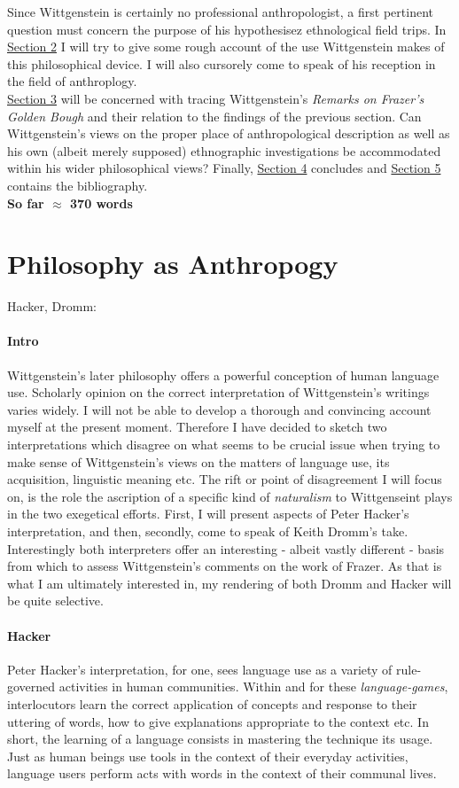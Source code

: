 \documentclass{article}
\begin{document}
Since Wittgenstein is certainly no professional anthropologist, a first pertinent question must concern the purpose of his hypothesisez ethnological field trips. In \hyperlink{sec2}{Section 2} I will try to give some rough account of the use Wittgenstein makes of this philosophical device. I will also cursorely come to speak of his reception in the field of anthroplogy. \\
\hyperlink{sec3}{Section 3} will be concerned with tracing Wittgenstein's \textit{Remarks on Frazer's Golden Bough} and their relation to the findings of the previous section. Can Wittgenstein’s views on the proper place of anthropological description as well as his own (albeit merely supposed) ethnographic investigations be accommodated within his wider philosophical views? Finally, \hyperlink{sec4}{Section 4} concludes and \hyperlink{sec4}{Section 5} contains the bibliography.\\
\textbf{So far $\approx$ 370 words} 
\section{Philosophy as Anthropogy}
\hypertarget{sec2}{Hacker, Dromm:}

\paragraph{Intro} Wittgenstein's later philosophy offers a powerful conception of human language use. Scholarly opinion on the correct interpretation of Wittgenstein's writings varies widely. I will not be able to develop a thorough and convincing account myself at the present moment. Therefore I have decided to sketch two interpretations which disagree on what seems to be crucial issue when trying to make sense of Wittgenstein's views on the matters of language use, its acquisition, linguistic meaning etc. The rift or point of disagreement I will focus on, is the role the ascription of a specific kind of \textit{naturalism} to Wittgenseint plays in the two exegetical efforts. First, I will present aspects of Peter Hacker's interpretation, and then, secondly, come to speak of Keith Dromm's take. Interestingly both interpreters offer an interesting - albeit vastly different - basis from which to assess Wittgenstein's comments on the work of Frazer. As that is what I am ultimately interested in, my rendering of both Dromm and Hacker will be quite selective.
\paragraph{Hacker} Peter Hacker's interpretation, for one, sees language use as a variety of rule-governed activities in human communities. Within and for these \textit{language-games}, interlocutors learn the correct application of concepts and response to their uttering of words, how to give explanations appropriate to the context etc. In short, the learning of a language consists in mastering the technique its usage. \\
Just as human beings use tools in the context of their everyday activities, language users perform acts with words in the context of their communal lives.
\end{document}
